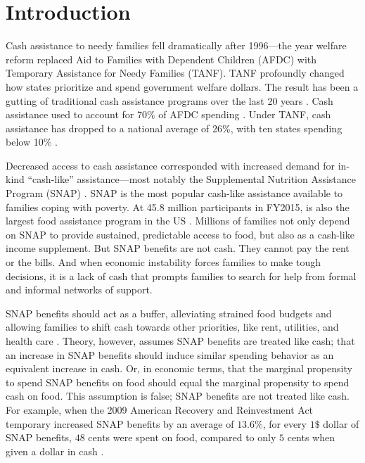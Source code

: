 \documentclass[12pt,letterpaperpaper,]{book}
\begin{document}
\section*{Introduction}\label{introduction}

Cash assistance to needy families fell dramatically after 1996---the
year welfare reform replaced Aid to Families with Dependent Children
(AFDC) with Temporary Assistance for Needy Families (TANF). TANF
profoundly changed how states prioritize and spend government welfare
dollars. The result has been a gutting of traditional cash assistance
programs over the last 20 years \citep{cbpp_chart_2016}. Cash assistance
used to account for 70\% of AFDC spending \citep{ziliak_temporary_2015}.
Under TANF, cash assistance has dropped to a national average of 26\%,
with ten states spending below 10\% \citep{schott_how_2015}.

Decreased access to cash assistance corresponded with increased demand
for in-kind ``cash-like'' assistance---most notably the Supplemental
Nutrition Assistance Program (SNAP)
\citep{us_department_of_health_and_human_services_welfare_2015}. SNAP is
the most popular cash-like assistance available to families coping with
poverty. At 45.8 million participants in FY2015, is also the largest
food assistance program in the US \citep{usda_fns_supplemental_2016}.
Millions of families not only depend on SNAP to provide sustained,
predictable access to food, but also as a cash-like income supplement.
But SNAP benefits are not cash. They cannot pay the rent or the bills.
And when economic instability forces families to make tough decisions,
it is a lack of cash that prompts families to search for help from
formal and informal networks of support.

SNAP benefits should act as a buffer, alleviating strained food budgets
and allowing families to shift cash towards other priorities, like rent,
utilities, and health care \citep{hoynes_snap_2015}. Theory, however,
assumes SNAP benefits are treated like cash; that an increase in SNAP
benefits should induce similar spending behavior as an equivalent
increase in cash. Or, in economic terms, that the marginal propensity to
spend SNAP benefits on food should equal the marginal propensity to
spend cash on food. This assumption is false; SNAP benefits are not
treated like cash. For example, when the 2009 American Recovery and
Reinvestment Act temporary increased SNAP benefits by an average of
\(13.6\%\), for every \(1\$\) dollar of SNAP benefits, \(48\) cents were
spent on food, compared to only \(5\) cents when given a dollar in cash
\citep{beatty_expenditure_2015}.
\end{document}
